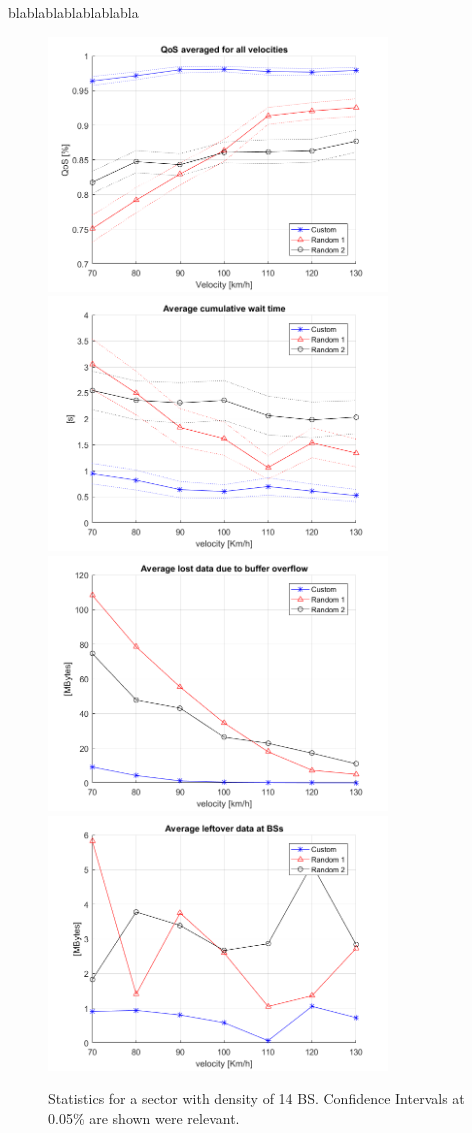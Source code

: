 \documentclass[conference,10pt]{IEEEtran}
\begin{document}
blablablablablablabla


\begin{figure}[t]
	\label{fig:7BS_all_stats}
	\centering
	\includegraphics[width=9cm]{QoS.png} \includegraphics[width=9cm]{UE_wait_time.png}
	\includegraphics[width=9cm]{UE_buffer_overflow.png} \includegraphics[width=9cm]{BS_leftover_data.png}
	\caption{Statistics for a sector with density of 14 BS. Confidence Intervals at 0.05\% are shown were relevant.}
\end{figure}
\end{document}
